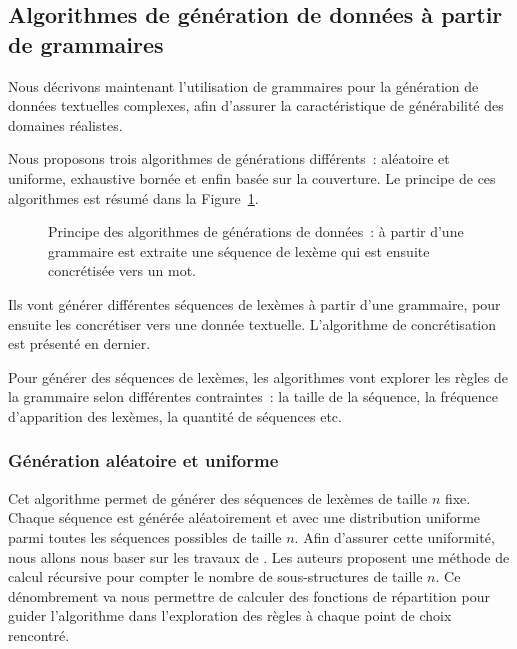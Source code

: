 \subsection{Algorithmes de génération de données à partir de grammaires}
\label{subsection:data:algorithms}

Nous décrivons maintenant l'utilisation de grammaires pour la génération de
données textuelles complexes, afin d'assurer la caractéristique de générabilité
des domaines réalistes.

Nous proposons trois algorithmes de générations différents~: aléatoire et
uniforme, exhaustive bornée et enfin basée sur la couverture. Le principe de
ces algorithmes est résumé dans la Figure~\ref{figure:data:grammar}.
%
\begin{figure}


\caption{\label{figure:data:grammar} Principe des algorithmes de générations de
données~: à partir d'une grammaire est extraite une séquence de lexème qui est
ensuite concrétisée vers un mot.}

\end{figure}
%
Ils vont générer différentes séquences de lexèmes à partir d'une grammaire, pour
ensuite les concrétiser vers une donnée textuelle. L'algorithme de
concrétisation est présenté en dernier.

Pour générer des séquences de lexèmes, les algorithmes vont explorer les règles
de la grammaire selon différentes contraintes~: la taille de la séquence, la
fréquence d'apparition des lexèmes, la quantité de séquences etc.

\subsubsection{Génération aléatoire et uniforme}
\label{subsection:data:random_uniform_generation}

Cet algorithme permet de générer des séquences de lexèmes de taille $n$ fixe.
Chaque séquence est générée aléatoirement et avec une distribution uniforme
parmi toutes les séquences possibles de taille $n$. Afin d'assurer cette
uniformité, nous allons nous baser sur les travaux de . Les
auteurs proposent une méthode de calcul récursive pour compter le nombre de
sous-structures de taille $n$. Ce dénombrement va nous permettre de calculer des
fonctions de répartition pour guider l'algorithme dans l'exploration des règles
à chaque point de choix rencontré.


